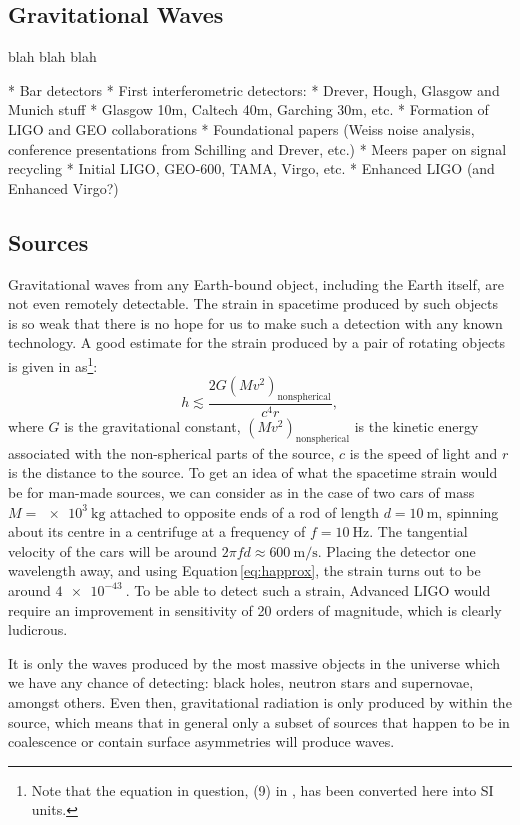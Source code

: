 \subsection{Gravitational Waves}
blah blah blah

* Bar detectors
* First interferometric detectors:
  * Drever, Hough, Glasgow and Munich stuff
  * Glasgow 10m, Caltech 40m, Garching 30m, etc.
  * Formation of LIGO and GEO collaborations
  * Foundational papers (Weiss noise analysis, conference presentations from Schilling and Drever, etc.)
  * Meers paper on signal recycling
  * Initial LIGO, GEO-600, TAMA, Virgo, etc.
  * Enhanced LIGO (and Enhanced Virgo?)

\subsection{Sources}
Gravitational waves from any Earth-bound object, including the Earth itself, are not even remotely detectable. The strain in spacetime produced by such objects is so weak that there is no hope for us to make such a detection with any known technology. A good estimate for the strain produced by a pair of rotating objects is given in \cite{Sathyaprakash2009} as\footnote{Note that the equation in question, (9) in \cite{Sathyaprakash2009}, has been converted here into SI units.}:
\begin{equation}
  \label{eq:happrox}
  h \lesssim \frac{2 G \left( M v^{2} \right)_{\text{nonspherical}}}{c^4 r},
\end{equation}
where $G$ is the gravitational constant, $\left( M v^{2} \right)_{\text{nonspherical}}$ is the kinetic energy associated with the non-spherical parts of the source, $c$ is the speed of light and $r$ is the distance to the source. To get an idea of what the spacetime strain would be for man-made sources, we can consider as in \cite{Sathyaprakash2009} the case of two cars of mass $M = \SI{e3}{\kilo\gram}$ attached to opposite ends of a rod of length $d = \SI{10}{\meter}$, spinning about its centre in a centrifuge at a frequency of $f = \SI{10}{\hertz}$. The tangential velocity of the cars will be around $2 \pi f d \approx \SI{600}{\meter\per\second}$. Placing the detector one wavelength away, and using Equation\,\ref{eq:happrox}, the strain turns out to be around $\SI{4e-43}{}$. To be able to detect such a strain, Advanced LIGO would require an improvement in sensitivity of \SI{20}{} orders of magnitude, which is clearly ludicrous.

It is only the waves produced by the most massive objects in the universe which we have any chance of detecting: black holes, neutron stars and supernovae, amongst others. Even then, gravitational radiation is only produced by  within the source, which means that in general only a subset of sources that happen to be in coalescence or contain surface asymmetries will produce waves.

